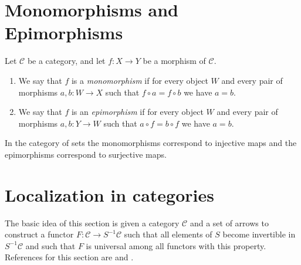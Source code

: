 \section{Monomorphisms and Epimorphisms}
\label{section-mono-epi}

\begin{definition}
\label{definition-mono-epi}
Let $\mathcal{C}$ be a category, and let $f : X \to Y$ be
a morphism of $\mathcal{C}$.
\begin{enumerate}
\item We say that $f$ is a {\it monomorphism} if for every object
$W$ and every pair of morphisms $a, b : W \to X$ such that
$f \circ a = f \circ b$ we have $a = b$.
\item We say that $f$ is an {\it epimorphism} if for every object
$W$ and every pair of morphisms $a, b : Y \to W$ such that
$a \circ f = b \circ f$ we have $a = b$.
\end{enumerate}
\end{definition}

\begin{example}
\label{example-mono-epi-sets}
In the category of sets the monomorphisms correspond to injective
maps and the epimorphisms correspond to surjective maps.
\end{example}





\section{Localization in categories}
\label{section-localization}

\noindent
The basic idea of this section is given a category $\mathcal{C}$
and a set of arrows to construct a functor
$F : \mathcal{C} \to S^{-1}\mathcal{C}$
such that all elements of $S$ become invertible in $S^{-1}\mathcal{C}$
and such that $F$ is universal among all functors with this property.
References for this section are \cite[Chapter I, Section 2]{GZ}
and \cite[Chapter II, Section 2]{Verdier}.

